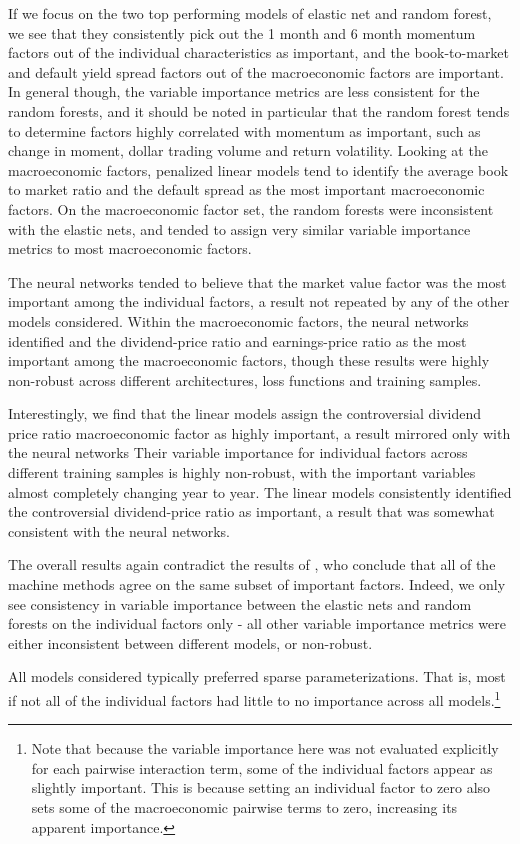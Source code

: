 \documentclass{article}
\begin{document}
If we focus on the two top performing models of elastic net and random forest, we see that they consistently pick out the 1 month and 6 month momentum factors out of the individual characteristics as important, and the book-to-market and default yield spread factors out of the macroeconomic factors are important. In general though, the variable importance metrics are less consistent for the random forests, and it should be noted in particular that the random forest tends to determine factors highly correlated with momentum as important, such as change in moment, dollar trading volume and return volatility. Looking at the macroeconomic factors, penalized linear models tend to identify the average book to market ratio and the default spread as the most important macroeconomic factors. On the macroeconomic factor set, the random forests were inconsistent with the elastic nets, and tended to assign very similar variable importance metrics to most macroeconomic factors.

The neural networks tended to believe that the market value factor was the most important among the individual factors, a result not repeated by any of the other models considered. Within the macroeconomic factors, the neural networks identified and the dividend-price ratio and earnings-price ratio as the most important among the macroeconomic factors, though these results were highly non-robust across different architectures, loss functions and training samples.

Interestingly, we find that the linear models assign the controversial dividend price ratio macroeconomic factor as highly important, a result mirrored only with the neural networks Their variable importance for individual factors across different training samples is highly non-robust, with the important variables almost completely changing year to year. The linear models consistently identified the controversial dividend-price ratio as important, a result that was somewhat consistent with the neural networks. 

The overall results again contradict the results of \cite{gu_empirical_2018}, who conclude that all of the machine methods agree on the same subset of important factors. Indeed, we only see consistency in variable importance between the elastic nets and random forests on the individual factors only - all other variable importance metrics were either inconsistent between different models, or non-robust.

All models considered typically preferred sparse parameterizations. That is, most if not all of the individual factors had little to no importance across all models.\footnote{Note that because the variable importance here was not evaluated explicitly for each pairwise interaction term, some of the individual factors appear as slightly important. This is because setting an individual factor to zero also sets some of the macroeconomic pairwise terms to zero, increasing its apparent importance.}
\end{document}
